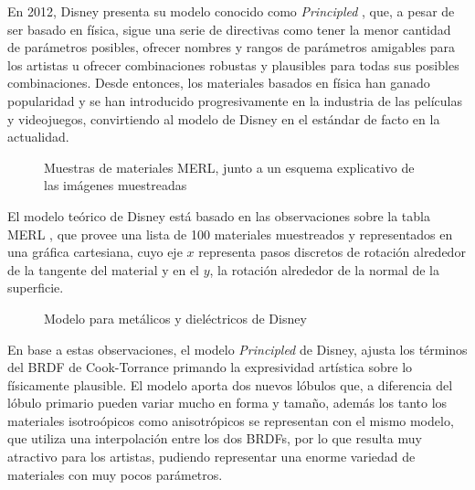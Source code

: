     En 2012, Disney presenta su modelo conocido como \textit{Principled} \autocite{disney12}, que, a pesar de ser basado en f\'isica, sigue una serie de directivas
    como tener la menor cantidad de par\'ametros posibles, ofrecer nombres y rangos de par\'ametros amigables para los artistas u ofrecer
    combinaciones robustas y plausibles para todas sus posibles combinaciones. Desde entonces, los materiales basados en f\'isica
    han ganado popularidad y se han introducido progresivamente en la industria de las pel\'iculas y videojuegos, convirtiendo
    al modelo de Disney en el est\'andar de facto en la actualidad.\\

    \begin{figure}[H]
        \vspace{0.5cm}
        \centering
        \caption{Muestras de materiales MERL, junto a un esquema explicativo de las im\'agenes muestreadas}
        \vspace{0.5cm}
    \end{figure}

    El modelo te\'orico de Disney est\'a basado en las observaciones sobre la tabla MERL \autocite{merl}, que provee una lista
    de 100 materiales muestreados y representados en una gr\'afica cartesiana, cuyo eje $x$ representa pasos discretos de rotaci\'on
    alrededor de la tangente del material y en el $y$, la rotaci\'on alrededor de la normal de la superficie. 

    \begin{figure}[H]
        \vspace{0.5cm}
        \centering
        \caption{Modelo para met\'alicos y diel\'ectricos de Disney}
        \vspace{0.5cm}
    \end{figure}

    En base a estas observaciones, el modelo \textit{Principled} de Disney, ajusta los t\'erminos del BRDF de Cook-Torrance \autocite{cooktorrance}
    primando la expresividad art\'istica sobre lo f\'isicamente plausible. El modelo aporta dos nuevos l\'obulos que, a diferencia del l\'obulo
    primario pueden variar mucho en forma y tama\~no, adem\'as los tanto los materiales isotro\'opicos como anisotr\'opicos
    se representan con el mismo modelo, que utiliza una interpolaci\'on entre los dos BRDFs, por lo que resulta muy atractivo para los artistas,
    pudiendo representar una enorme variedad de materiales con muy pocos par\'ametros.\\

